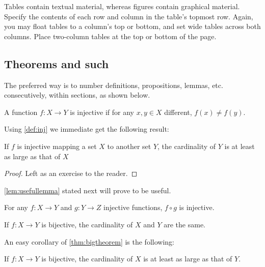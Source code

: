     Tables contain textual material, whereas figures contain graphical material.
    Specify the contents of each row and column in the table's topmost
    row. Again, you may float tables to a column's top or bottom, and set
    wide tables across both columns. Place two-column tables at the
    top or bottom of the page.


    \subsection{Theorems and such}
        The preferred way is to number definitions, propositions, lemmas, etc. 
        consecutively, within sections, as shown below.

        \begin{definition}
            \label{def:inj}
            A function $f:X \to Y$ is injective if for any $x,y\in X$ different, $f(x)\ne f(y)$.
        \end{definition}

        Using \cref{def:inj} we immediate get the following result:

        \begin{proposition}
            If $f$ is injective mapping a set $X$ to another set $Y$, the cardinality of 
            $Y$ is at least as large as that of $X$
        \end{proposition}

        \begin{proof} 
            Left as an exercise to the reader. 
        \end{proof}

        \cref{lem:usefullemma} stated next will prove to be useful.

        \begin{lemma}
            \label{lem:usefullemma}
            For any $f:X \to Y$ and $g:Y\to Z$ injective functions, $f \circ g$ is injective.
        \end{lemma}

        \begin{theorem}
            \label{thm:bigtheorem}
            If $f:X\to Y$ is bijective, the cardinality of $X$ and $Y$ are the same.
        \end{theorem}

        An easy corollary of \cref{thm:bigtheorem} is the following:

        \begin{corollary}
            If $f:X\to Y$ is bijective, the cardinality of $X$ is at least as large as 
            that of $Y$.
        \end{corollary}

